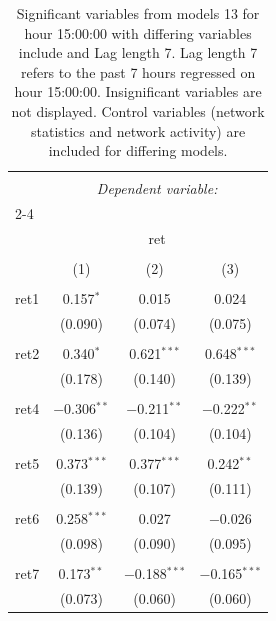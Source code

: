 
\begin{table}[!htbp] \centering 
  \caption{Significant variables from models 13 for hour 15:00:00 with differing variables include 
                               and Lag length 7. Lag length 7 refers to the past 7 hours regressed on hour 15:00:00. 
                               Insignificant variables are not displayed. 
                               Control variables (network statistics and network activity) are 
                               included for differing models.} 
  \label{RVmodels2_t_hourlagged2} 
\scriptsize 
\begin{tabular}{@{\extracolsep{5pt}}lccc} 
\\[-1.8ex]\hline 
\hline \\[-1.8ex] 
 & \multicolumn{3}{c}{\textit{Dependent variable:}} \\ 
\cline{2-4} 
\\[-1.8ex] & \multicolumn{3}{c}{ret} \\ 
\\[-1.8ex] & (1) & (2) & (3)\\ 
\hline \\[-1.8ex] 
 ret1 & 0.157$^{*}$ & 0.015 & 0.024 \\ 
  & (0.090) & (0.074) & (0.075) \\ 
  & & & \\ 
 ret2 & 0.340$^{*}$ & 0.621$^{***}$ & 0.648$^{***}$ \\ 
  & (0.178) & (0.140) & (0.139) \\ 
  & & & \\ 
 ret4 & $-$0.306$^{**}$ & $-$0.211$^{**}$ & $-$0.222$^{**}$ \\ 
  & (0.136) & (0.104) & (0.104) \\ 
  & & & \\ 
 ret5 & 0.373$^{***}$ & 0.377$^{***}$ & 0.242$^{**}$ \\ 
  & (0.139) & (0.107) & (0.111) \\ 
  & & & \\ 
 ret6 & 0.258$^{***}$ & 0.027 & $-$0.026 \\ 
  & (0.098) & (0.090) & (0.095) \\ 
  & & & \\ 
 ret7 & 0.173$^{**}$ & $-$0.188$^{***}$ & $-$0.165$^{***}$ \\ 
  & (0.073) & (0.060) & (0.060) \\ 

\end{tabular}
\end{table}
